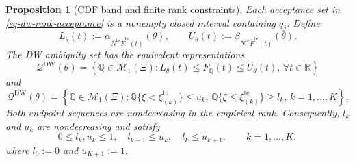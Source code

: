 \documentclass[review,11pt,3p,authoryear,nopreprintline]{elsarticle}
\newtheorem{proposition}{Proposition}
\begin{document}
\begin{proposition}[CDF band and finite rank constraints]
  \label{prop-finite-rank-constraints}
  Each acceptance set in \eqref{eq-dw-rank-acceptance} is a nonempty closed interval containing $q_j$. Define
  \[
    L_\theta(t):=\alpha_{N^{\mathrm{te}}\widehat F^{\mathrm{te}}(t)}(\theta),
    \qquad
    U_\theta(t):=\beta_{N^{\mathrm{te}}\widehat F^{\mathrm{te}}(t)}(\theta).
  \]
  The DW ambiguity set has the equivalent representations
  \begin{equation*}
    \mathcal Q^{\mathrm{DW}}(\theta) =\left\{\mathbb Q\in\mathcal M_1(\Xi): L_\theta(t)\le F_{\mathbb Q}(t)\le U_\theta(t), \, \forall t\in\mathbb R\right\}
  \end{equation*}
  and
  \begin{equation}
    \mathcal Q^{\mathrm{DW}}(\theta)
    =\left\{\mathbb Q\in\mathcal M_1(\Xi): \mathbb Q\{\xi<\xi_{(k)}^{\mathrm{te}}\}\le u_k, \, \mathbb Q\{\xi\le \xi_{(k)}^{\mathrm{te}}\}\ge l_k, \, k=1,\ldots,K \right\}.
    \label{eq-finite-rank-constraints}
  \end{equation}
  Both endpoint sequences are nondecreasing in the empirical rank. Consequently, $l_k$ and $u_k$ are nondecreasing and satisfy
  \begin{equation*}
    0\le l_k,u_k\le1,\quad
    l_{k-1}\le u_k,\quad
    l_k\le u_{k+1},
    \qquad k=1,\ldots,K,
  \end{equation*}
  where $l_0:=0$ and $u_{K+1}:=1$.
\end{proposition}
\end{document}
